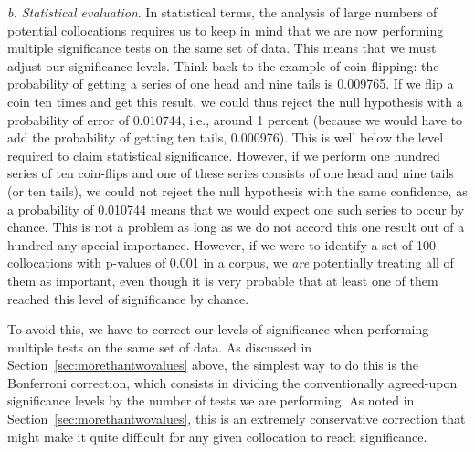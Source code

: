 \textit{b. Statistical evaluation}. In statistical terms, the analysis of large numbers of potential collocations  requires us to keep in mind that we are now performing multiple significance  tests on the same set of data. This means that we must adjust our significance levels. Think back to the example of coin\hyp{}flipping: the probability  of getting a series of one head and nine tails is 0.009765. If we flip a coin ten times and get this result, we could thus reject the null hypothesis  with a probability  of error of 0.010744, i.e., around 1 percent (because we would have to add the probability of getting ten tails, 0.000976). This is well below the level required to claim statistical significance. However, if we perform one hundred series of ten coin\hyp{}flips and one of these series consists of one head and nine tails (or ten tails), we could not reject the null hypothesis  with the same confidence, as a probability of 0.010744 means that we would expect one such series to occur by chance.  This is not a problem as long as we do not accord this one result out of a hundred any special importance. However, if we were to identify a set of 100 collocations  with p\hyp{}values of 0.001 in a corpus, we \textit{are} potentially treating all of them as important, even though it is very probable that at least one of them reached this level of significance  by  chance.

To avoid this, we have to correct our levels of significance  when performing multiple tests on the same set of data. As discussed in Section~\ref{sec:morethantwovalues} above, the simplest way to do this is the Bonferroni  correction, which consists in dividing the conventionally agreed\hyp{}upon significance  levels by the number of tests we are performing. As noted in Section~\ref{sec:morethantwovalues}, this is an extremely conservative correction that might make it quite difficult for any given collocation  to reach significance.


